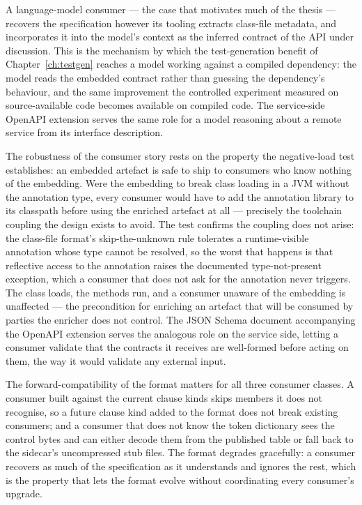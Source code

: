 A language-model consumer --- the case that motivates much of the thesis ---
recovers the specification however its tooling extracts class-file metadata, and
incorporates it into the model's context as the inferred contract of the API under
discussion. This is the mechanism by which the test-generation benefit of
Chapter~\ref{ch:testgen} reaches a model working against a compiled dependency:
the model reads the embedded contract rather than guessing the dependency's
behaviour, and the same improvement the controlled experiment measured on
source-available code becomes available on compiled code. The service-side OpenAPI
extension serves the same role for a model reasoning about a remote service from
its interface description.

The robustness of the consumer story rests on the property the negative-load test
establishes: an embedded artefact is safe to ship to consumers who know nothing of
the embedding. Were the embedding to break class loading in a JVM without the
annotation type, every consumer would have to add the annotation library to its
classpath before using the enriched artefact at all --- precisely the toolchain
coupling the design exists to avoid. The test confirms the coupling does not arise:
the class-file format's skip-the-unknown rule tolerates a runtime-visible
annotation whose type cannot be resolved, so the worst that happens is that
reflective access to the annotation raises the documented type-not-present
exception, which a consumer that does not ask for the annotation never triggers.
The class loads, the methods run, and a consumer unaware of the embedding is
unaffected --- the precondition for enriching an artefact that will be consumed by
parties the enricher does not control. The JSON Schema document accompanying the
OpenAPI extension serves the analogous role on the service side, letting a consumer
validate that the contracts it receives are well-formed before acting on them, the
way it would validate any external input.

The forward-compatibility of the format matters for all three consumer classes. A
consumer built against the current clause kinds skips members it does not
recognise, so a future clause kind added to the format does not break existing
consumers; and a consumer that does not know the token dictionary sees the control
bytes and can either decode them from the published table or fall back to the
sidecar's uncompressed stub files. The format degrades gracefully: a consumer
recovers as much of the specification as it understands and ignores the rest, which
is the property that lets the format evolve without coordinating every consumer's
upgrade.

